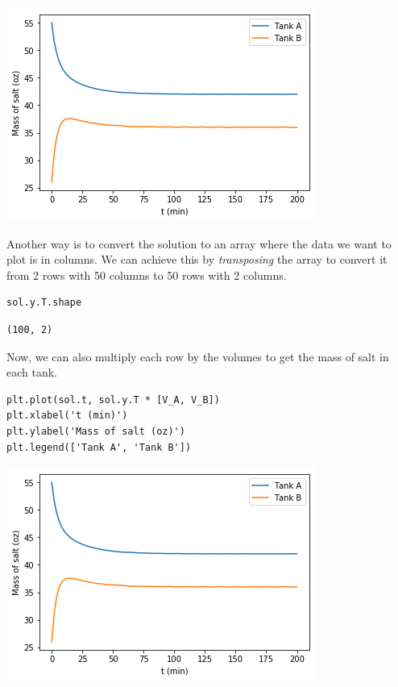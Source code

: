 \documentclass[11pt]{article}
\begin{document}
\begin{center}
\includegraphics[width=.9\linewidth]{obipy-resources/05b8b46ebbc2df3b9d545d77190f5234-68311G6j.png}
\end{center}

Another way is to convert the solution to an array where the data we want to plot is in columns. We can achieve this by \emph{transposing} the array to convert it from 2 rows with 50 columns to 50 rows with 2 columns.

\begin{verbatim}
sol.y.T.shape
\end{verbatim}

\begin{verbatim}
(100, 2)
\end{verbatim}


Now, we can also multiply each row by the volumes to get the mass of salt in each tank.

\begin{verbatim}
plt.plot(sol.t, sol.y.T * [V_A, V_B])
plt.xlabel('t (min)')
plt.ylabel('Mass of salt (oz)')
plt.legend(['Tank A', 'Tank B'])
\end{verbatim}

\begin{center}
\includegraphics[width=.9\linewidth]{obipy-resources/05b8b46ebbc2df3b9d545d77190f5234-68311TEq.png}
\end{center}
\end{document}
